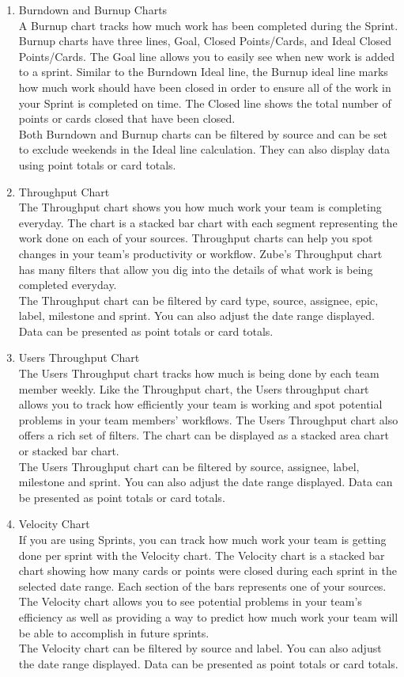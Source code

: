 \documentclass[12pt,a4paper]{report}
\begin{document}
\begin{enumerate}
	\renewcommand{\labelenumi}{{\textbf{\arabic{enumi}.}}}
	\item Burndown and Burnup Charts\\
	A Burnup chart tracks how much work has been completed during the Sprint. Burnup charts have three lines, Goal, Closed Points/Cards, and Ideal Closed Points/Cards. The Goal line allows you to easily see when new work is added to a sprint. Similar to the Burndown Ideal line, the Burnup ideal line marks how much work should have been closed in order to ensure all of the work in your Sprint is completed on time. The Closed line shows the total number of points or cards closed that have been closed. \\
	Both Burndown and Burnup charts can be filtered by source and can be set to exclude weekends in the Ideal line calculation. They can also display data using point totals or card totals. 
	\item Throughput Chart\\
	The Throughput chart shows you how much work your team is completing everyday. The chart is a stacked bar chart with each segment representing the work done on each of your sources. Throughput charts can help you spot changes in your team's productivity or workflow. Zube's Throughput chart has many filters that allow you dig into the details of what work is being completed everyday.\\ 
	The Throughput chart can be filtered by card type, source, assignee, epic, label, milestone and sprint. You can also adjust the date range displayed. Data can be presented as point totals or card totals. 
	\item Users Throughput Chart\\
	The Users Throughput chart tracks how much is being done by each team member weekly. Like the Throughput chart, the Users throughput chart allows you to track how efficiently your team is working and spot potential problems in your team members' workflows. The Users Throughput chart also offers a rich set of filters. The chart can be displayed as a stacked area chart or stacked bar chart. \\
	The Users Throughput chart can be filtered by source, assignee, label, milestone and sprint. You can also adjust the date range displayed. Data can be presented as point totals or card totals. 
	\item Velocity Chart\\
	If you are using Sprints, you can track how much work your team is getting done per sprint with the Velocity chart. The Velocity chart is a stacked bar chart showing how many cards or points were closed during each sprint in the selected date range. Each section of the bars represents one of your sources. The Velocity chart allows you to see potential problems in your team's efficiency as well as providing a way to predict how much work your team will be able to accomplish in future sprints. \\
	The Velocity chart can be filtered by source and label. You can also adjust the date range displayed. Data can be presented as point totals or card totals. 
\end{enumerate}
\end{document}
